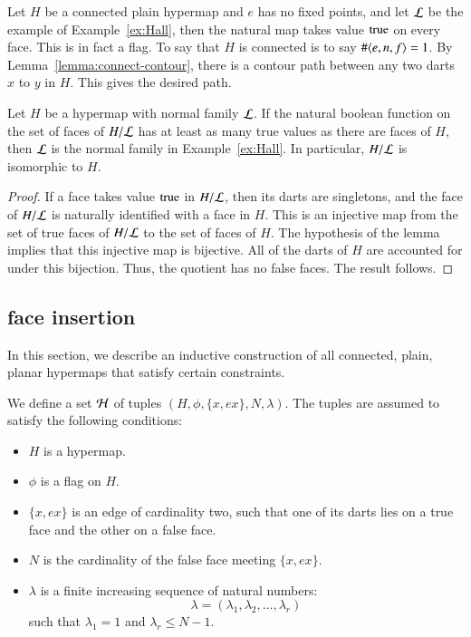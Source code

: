 \begin{example} Let 
$H$ be a connected plain hypermap and $e$ has no fixed points,
and let $\cal L$ be the example of Example~\ref{ex:Hall}, 
then the natural
map takes value ${\operatorname{true}}$ on every face.  This is in fact a flag.
To say that $H$ is connected is to say $\#\langle e,n,f\rangle=1$. 
By Lemma~\ref{lemma:connect-contour}, there is a contour path between
any two darts $x$ to $y$ in $H$.  This gives the desired path.
\end{example}

\begin{lemma}\label{lemma:all-dart}  
Let $H$ be a hypermap with normal family ${\cal L}$.
If the natural boolean function on the set of faces of
$H/{\cal L}$ has at least as many
true values as there are faces of $H$, then $\cal L$ is the normal family
in Example~\ref{ex:Hall}. In particular, $H/{\cal L}$ is isomorphic to $H$.
\end{lemma}

\begin{proof}  If a face takes value ${\operatorname{true}}$ 
in $H/{\cal L}$, then its darts are
singletons, and the face of $H/{\cal L}$ is naturally identified with
 a face in $H$.  This is an injective map from the 
set of true faces of $H/{\cal L}$ to
the set of faces of $H$.  The hypothesis of the lemma implies that this
injective map is bijective.
All of the darts of $H$ are accounted for under this bijection.
Thus, the quotient has no
false faces.  The result follows.
\end{proof}


\subsection{face insertion}


In this section, we describe an inductive construction of all
connected, plain, planar hypermaps that satisfy certain constraints.

We define a set ${\cal H}$ of tuples $(H,\phi,\{x,e x\},N,\lambda)$.
The tuples are assumed to satisfy the following conditions:
\begin{itemize}
    \item $H$ is a hypermap.
    \item $\phi$ is a flag on $H$.
    \item $\{x,e x\}$ is an edge of cardinality two, such that one
    of its darts lies on a true face and the other on a false face.
    \item $N$ is the cardinality of the false face meeting $\{x,e
    x\}$.
    \item $\lambda$ is a finite increasing sequence of natural numbers:
        $$
        \lambda = (\lambda_1,\lambda_2,\ldots,\lambda_r)
        $$
    such that $\lambda_1 = 1$ and $\lambda_r \le N-1$.
\end{itemize}

